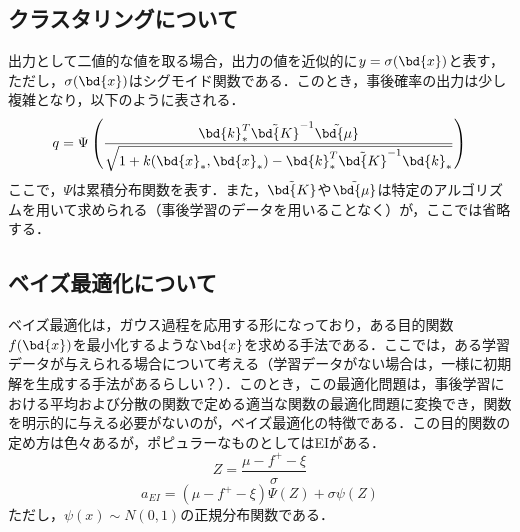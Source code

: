 	\subsection{クラスタリングについて}
		出力として二値的な値を取る場合，出力の値を近似的に$ y = \sigma(\bd{x}) $と表す，ただし，$ \sigma(\bd{x}) $はシグモイド関数である．このとき，事後確率の出力は少し複雑となり，以下のように表される．
		\begin{equation}\label{eq:y_*=1}
			q = \Psi\left( \frac{\bd{k}_*^T \tilde{\bd{K}}^{-1} \tilde{\bd{\mu}}}{\sqrt{1+k(\bd{x}_*,\bd{x}_*)-\bd{k}_*^T \tilde{\bd{K}}^{-1} \bd{k}_*}} \right)
		\end{equation}
		ここで，$ \Psi $は累積分布関数を表す．また，$ \tilde{\bd{K}} $や$ \tilde{\bd{\mu}} $は特定のアルゴリズムを用いて求められる（事後学習のデータを用いることなく）が，ここでは省略する．
	\subsection{ベイズ最適化について}
	ベイズ最適化は，ガウス過程を応用する形になっており，ある目的関数$ f(\bd{x}) $を最小化するような$ \bd{x} $を求める手法である．ここでは，ある学習データが与えられる場合について考える（学習データがない場合は，一様に初期解を生成する手法があるらしい？）．このとき，この最適化問題は，事後学習における平均および分散の関数で定める適当な関数の最適化問題に変換でき，関数を明示的に与える必要がないのが，ベイズ最適化の特徴である．この目的関数の定め方は色々あるが，ポピュラーなものとしてはEIがある．
	\begin{equation}\label{eq:Zeq}
		Z = \frac{\mu - f^+ -\xi}{\sigma}
	\end{equation}
	\begin{equation}
		a_{EI} = (\mu - f^+ -\xi)\Psi(Z) + \sigma \psi(Z)
	\end{equation}
	ただし，$ \psi(x) \sim N(0,1)$の正規分布関数である．